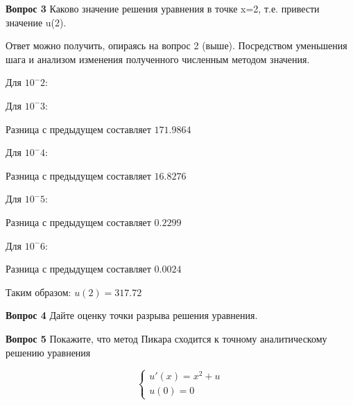 \textbf{Вопрос 3} Каково значение решения уравнения в точке x=2, т.е. привести значение u(2).

Ответ можно получить, опираясь на вопрос 2 (выше). Посредством уменьшения шага и анализом изменения полученного численным методом значения. 

Для $10^-2$:

Для $10^-3$:

Разница с предыдущем составляет $171.9864$


Для $10^-4$:

Разница с предыдущем составляет  $16.8276$

Для $10^-5$:

Разница с предыдущем составляет  $0.2299$

Для $10^-6$:
\newpage

Разница с предыдущем составляет  $0.0024$

Таким образом: $u(2) = 317.72$

\textbf{Вопрос 4} Дайте оценку точки разрыва решения уравнения.

\textbf{Вопрос 5} Покажите, что метод Пикара сходится к точному аналитическому решению уравнения 

	\begin{equation}
	\label{initial_odu}
	\begin{cases}
	u'(x) = x^2 + u\\
	u(0) = 0
	\end{cases}
	\end{equation}\newline

